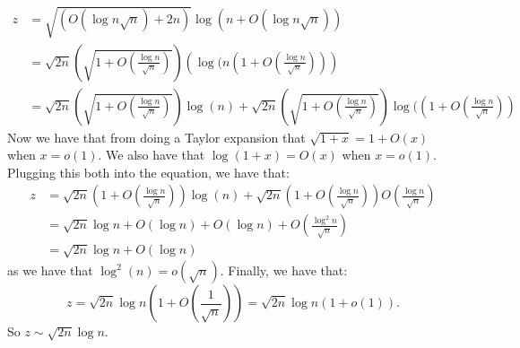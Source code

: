 \documentclass[]{article}
\begin{document}
\begin{align*}
	z &= \sqrt{(O(\log n \sqrt{n}) + 2n)}\log(n + O(\log n \sqrt n))\\
	&= \sqrt{2n} \left(\sqrt{1 + O(\frac{\log n}{\sqrt{n}})}\right) \left(\log( n(1 + O(\frac{\log n}{\sqrt{n}} )) \right)\\
	&= \sqrt{2n}\left(\sqrt{1 + O(\frac{\log n}{\sqrt{n}})}\right) \log(n) + \sqrt{2n}\left(\sqrt{1 + O(\frac{\log n}{\sqrt{n}})}\right) \log((1 + O(\frac{\log n}{\sqrt{n}}))
	\end{align*}
Now we have that from doing a Taylor expansion that $\sqrt{1 + x} = 1 + O(x)$ when $x = o(1)$. We also have that $\log(1 + x) = O(x)$ when $x = o(1)$. Plugging this both into the equation, we have that:
\begin{align*}
	z &= \sqrt{2n}(1 + O(\frac{\log n}{\sqrt{n}})) \log(n) + \sqrt{2n}(1 + O(\frac{\log n}{\sqrt{n}}))O(\frac{\log n}{\sqrt{n}})\\
	&= \sqrt{2n} \log n + O(\log n) + O(\log n) + O(\frac{\log^2 n}{\sqrt{n}})\\
	&= \sqrt{2n} \log n + O(\log n)
\end{align*}
as we have that $\log^2(n) = o(\sqrt{n})$. Finally, we have that:
\begin{equation}
	z = \sqrt{2n} \log n ( 1 + O(\frac{1}{\sqrt{n}})) = \sqrt{2n} \log n (1 + o(1)).
\end{equation}
So $z \sim \sqrt{2n} \log n$.
\end{document}
